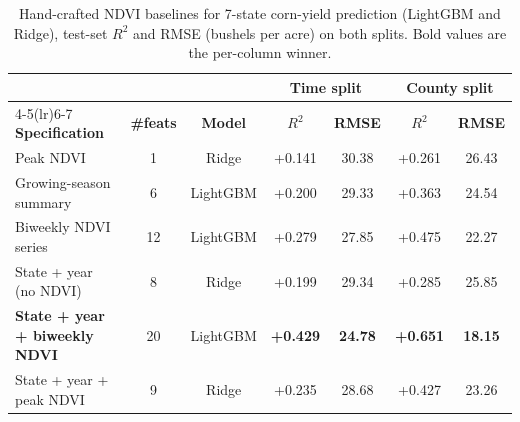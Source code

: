 \begin{table}[H]
\centering
\caption{Hand-crafted NDVI baselines for 7-state corn-yield prediction (LightGBM and Ridge),
test-set $R^2$ and RMSE (bushels per acre) on both splits. Bold values are the per-column winner.}
\label{tab:baselines}
\begin{tabular}{lcccccc}
\toprule
& & & \multicolumn{2}{c}{\textbf{Time split}} & \multicolumn{2}{c}{\textbf{County split}} \\
\cmidrule(lr){4-5}\cmidrule(lr){6-7}
\textbf{Specification} & \textbf{\#feats} & \textbf{Model} & \textbf{$R^2$} & \textbf{RMSE} & \textbf{$R^2$} & \textbf{RMSE} \\
\midrule
Peak NDVI & 1 & Ridge & +0.141 & 30.38 & +0.261 & 26.43 \\
Growing-season summary & 6 & LightGBM & +0.200 & 29.33 & +0.363 & 24.54 \\
Biweekly NDVI series & 12 & LightGBM & +0.279 & 27.85 & +0.475 & 22.27 \\
State + year (no NDVI) & 8 & Ridge & +0.199 & 29.34 & +0.285 & 25.85 \\
\textbf{State + year + biweekly NDVI} & 20 & LightGBM & \textbf{+0.429} & \textbf{24.78} & \textbf{+0.651} & \textbf{18.15} \\
State + year + peak NDVI & 9 & Ridge & +0.235 & 28.68 & +0.427 & 23.26 \\
\bottomrule
\end{tabular}
\end{table}
